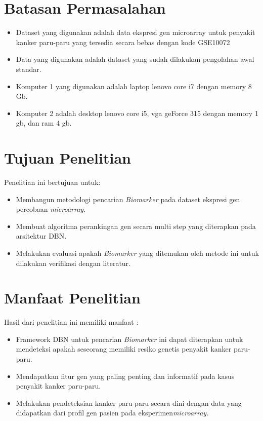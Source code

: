 \section{Batasan Permasalahan}

\begin{itemize}
\item Dataset yang digunakan adalah data ekspresi gen microarray untuk penyakit kanker paru-paru yang tersedia secara bebas dengan kode GSE10072
\item Data yang digunakan adalah dataset yang sudah dilakukan pengolahan awal standar.
\item Komputer 1 yang digunakan adalah laptop lenovo core i7 dengan memory 8 Gb.
\item Komputer 2 adalah desktop lenovo core i5, vga geForce 315 dengan memory 1 gb, dan ram 4 gb.
\end{itemize}

\section{Tujuan Penelitian}
Penelitian ini bertujuan untuk:
\begin{itemize}
\item Membangun metodologi pencarian \textit{Biomarker} pada dataset ekspresi gen percobaan \textit{microarray}.
\item Membuat algoritma perankingan gen secara multi step yang diterapkan pada arsitektur DBN.
\item Melakukan evaluasi apakah \textit{Biomarker} yang ditemukan oleh metode ini untuk dilakukan verifikasi dengan literatur.
\end{itemize}


\section{Manfaat Penelitian}
Hasil dari penelitian ini memiliki manfaat :
\begin{itemize}
\item Framework DBN untuk pencarian \textit{Biomarker} ini dapat diterapkan untuk mendeteksi apakah seseorang memiliki resiko genetis penyakit kanker paru-paru. 
\item Mendapatkan fitur gen yang paling penting dan informatif pada kasus penyakit kanker paru-paru.
\item Melakukan pendeteksian kanker paru-paru secara dini dengan data yang didapatkan dari profil gen pasien pada eksperimen\textit{microarray}.
\end{itemize}


